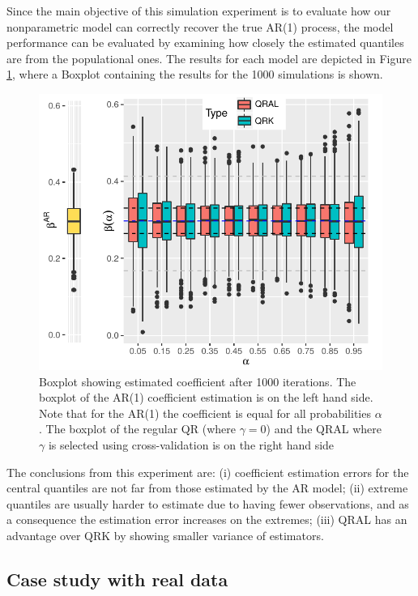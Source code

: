 Since the main objective of this simulation experiment is to evaluate how our nonparametric model can correctly recover the true AR(1) process, the model performance can be evaluated by examining how closely the estimated quantiles are from the populational ones. The results for each model are depicted in Figure \ref{fig:boxplot-ar1}, where a Boxplot containing the results for the 1000 simulations is shown. %
\begin{figure}[ht]
	\centering
	\includegraphics[width=1.0\linewidth]{Images/boxplot-ar1.pdf}
	\caption{Boxplot showing estimated coefficient after 1000 iterations. The boxplot of the AR(1) coefficient estimation is on the left hand side. Note that for the AR(1) the coefficient is equal for all probabilities $\alpha$. The boxplot of the regular QR (where $\gamma = 0$) and the QRAL where $\gamma$ is selected using cross-validation is on the right hand side }
	\label{fig:boxplot-ar1}
\end{figure}
The conclusions from this experiment are: (i) coefficient estimation errors for the central quantiles are not far from those estimated by the AR model; (ii) extreme quantiles are usually harder to estimate due to having fewer observations, and as a consequence the estimation error increases on the extremes; (iii) QRAL has an advantage over QRK by showing smaller variance of estimators.


\subsection{Case study with real data}

